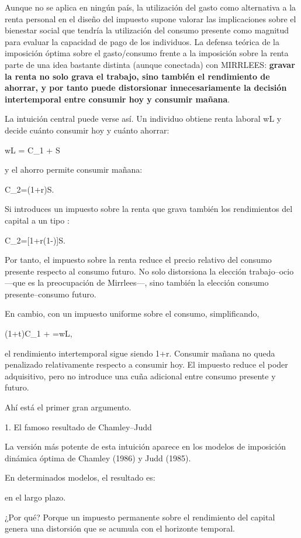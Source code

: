 \documentclass[10pt,a4paper]{article}
\begin{document}
Aunque no se aplica en ningún país, la utilización del gasto como alternativa a la renta personal en el diseño del impuesto supone valorar las implicaciones sobre el bienestar social que tendría la utilización del consumo presente como magnitud para evaluar la capacidad de pago de los individuos.  La defensa teórica de la imposición óptima sobre el gasto/consumo frente a la imposición sobre la renta parte de una idea bastante distinta (aunque conectada) con MIRRLEES: \textbf{gravar la renta no solo grava el trabajo, sino también el rendimiento de ahorrar, y por tanto puede distorsionar innecesariamente la decisión intertemporal entre consumir hoy y consumir mañana}.

La intuición central puede verse así. Un individuo obtiene renta laboral wL y decide cuánto consumir hoy y cuánto ahorrar:

wL = C_1 + S

y el ahorro permite consumir mañana:

C_2=(1+r)S.

Si introduces un impuesto sobre la renta que grava también los rendimientos del capital a un tipo \tau:

C_2=[1+r(1-\tau)]S.

Por tanto, el impuesto sobre la renta reduce el precio relativo del consumo presente respecto al consumo futuro. No solo distorsiona la elección trabajo–ocio —que es la preocupación de Mirrlees—, sino también la elección consumo presente–consumo futuro.

En cambio, con un impuesto uniforme sobre el consumo, simplificando,

(1+t)C_1 + =wL,

el rendimiento intertemporal sigue siendo 1+r. Consumir mañana no queda penalizado relativamente respecto a consumir hoy. El impuesto reduce el poder adquisitivo, pero no introduce una cuña adicional entre consumo presente y futuro.

Ahí está el primer gran argumento.

1. El famoso resultado de Chamley–Judd

La versión más potente de esta intuición aparece en los modelos de imposición dinámica óptima de Chamley (1986) y Judd (1985).

En determinados modelos, el resultado es:


en el largo plazo.

¿Por qué? Porque un impuesto permanente sobre el rendimiento del capital genera una distorsión que se acumula con el horizonte temporal.
\end{document}
